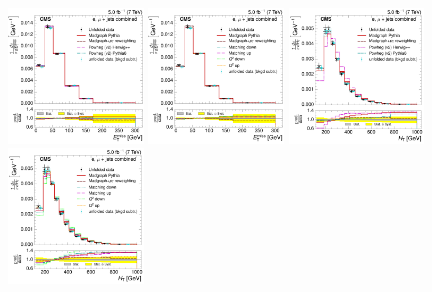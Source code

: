\begin{figure}[hbtp]
    \centering
     \includegraphics[width=0.32\textwidth]{Chapters/07_08_09_Analysis/Images/results/fit/7TeV/MET/central/normalised_xsection_combined_different_generators_with_bkgd_subtraction_results.pdf}\hfill
     \includegraphics[width=0.32\textwidth]{Chapters/07_08_09_Analysis/Images/results/fit/7TeV/MET/central/normalised_xsection_combined_systematics_shifts_with_bkgd_subtraction_results.pdf}\hfill
     \includegraphics[width=0.32\textwidth]{Chapters/07_08_09_Analysis/Images/results/fit/7TeV/HT/central/normalised_xsection_combined_different_generators_with_bkgd_subtraction_results.pdf}\\
     \includegraphics[width=0.32\textwidth]{Chapters/07_08_09_Analysis/Images/results/fit/7TeV/HT/central/normalised_xsection_combined_systematics_shifts_with_bkgd_subtraction_results.pdf}\hfill

\end{figure}
